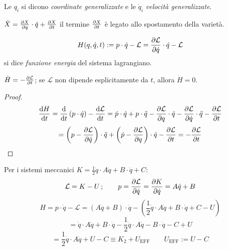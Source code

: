 \begin{definition}
    Le $q_i $ si dicono \textit{coordinate generalizzate} e le $\dot{q}_i $ \textit{velocità generalizzate}.
\end{definition}
\begin{remark}
    $\dot{X}= \pdv{X}{q}\cdot \dot{q}+\pdv{X}{t}$ il termine $\pdv{X}{t}$ è legato allo spostamento della varietà.
\end{remark}

\begin{definition}
    \begin{equation}
        H(q,\dot{q},t):= p\cdot\dot{q}-\mathcal{L}= \pdv{\mathcal{L}}{\dot{q}}\cdot\dot{q}-\mathcal{L}
    \end{equation}
    si dice \textit{funzione energia} del sistema lagrangiano.
\end{definition}
\begin{proposition}
    $\dot{H}= -\pdv{\mathcal{L}}{t}$; se $\mathcal{L}$ non dipende esplicitamente da $t$, allora $\dot{H}=0$.
\end{proposition}
\begin{proof}
    \begin{equation*}
        \dv{H}{t}= \dv{t}\left( p\cdot\dot{q} \right)-\dv{\mathcal{L}}{t}= 
        \dot{p}\cdot\dot{q}+p\cdot\ddot{q}-\pdv{\mathcal{L}}{q}\cdot \dot{q}-\pdv{\mathcal{L}}{\dot{q}}\cdot\ddot{q}-\pdv{\mathcal{L}}{t}
    \end{equation*}
    \begin{equation*}
        = \left( p-\pdv{\mathcal{L}}{\dot{q}} \right)\cdot \ddot{q}+\left( \dot{p}-\pdv{\mathcal{L}}{q} \right)\cdot \dot{q}-\pdv{\mathcal{L}}{t}= -\pdv{\mathcal{L}}{t}
    \end{equation*}
\end{proof}

Per i sistemi meccanici $K = \frac{1}{2}\dot{q}\cdot A\dot{q}+ B\cdot \dot{q}+ C $:
\begin{equation*}
    \mathcal{L}= K-U\,;\qquad p = \pdv{\mathcal{L}}{\dot{q}}= \pdv{K}{\dot{q}}= A\dot{q}+B 
\end{equation*}
\begin{equation*}
    H = p \cdot \dot{q} - \mathcal{L} = (A\dot{q} + B) \cdot \dot{q} - \left( \frac{1}{2} \dot{q} \cdot A \dot{q} + B \cdot \dot{q} + C - U \right)
\end{equation*}
\begin{equation*}
    = \dot{q} \cdot A \dot{q} + B \cdot \dot{q} - \frac{1}{2} \dot{q} \cdot A \dot{q} - B \cdot \dot{q} - C + U
\end{equation*}
\begin{equation}
    = \frac{1}{2} \dot{q} \cdot A \dot{q} + U - C \equiv K_2 + U_{\text{EFF}} \qquad U_{\text{EFF}} := U - C
\end{equation}


